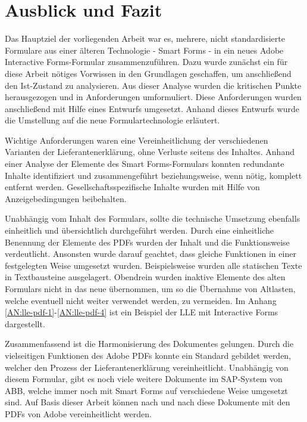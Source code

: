 \chapter{Ausblick und Fazit}
\label{ch:Ausblick}

Das Hauptziel der vorliegenden Arbeit war es, mehrere, nicht standardisierte Formulare aus einer älteren Technologie - Smart Forms - in ein neues Adobe Interactive Forms-Formular zusammenzuführen. Dazu wurde zunächst ein für diese Arbeit nötiges Vorwissen in den Grundlagen geschaffen, um anschließend den Ist-Zustand zu analysieren. Aus dieser Analyse wurden die kritischen Punkte herausgezogen und in Anforderungen umformuliert. Diese Anforderungen wurden anschließend mit Hilfe eines Entwurfs umgesetzt. Anhand dieses Entwurfs wurde die Umstellung auf die neue Formulartechnologie erläutert.

Wichtige Anforderungen waren eine Vereinheitlichung der verschiedenen Varianten der Lieferantenerklärung, ohne Verluste seitens des Inhaltes. Anhand einer Analyse der Elemente des Smart Forms-Formulars konnten redundante Inhalte identifiziert und zusammengeführt beziehungsweise, wenn nötig, komplett entfernt werden. Gesellschaftsspezifische Inhalte wurden mit Hilfe von Anzeigebedingungen beibehalten.

Unabhängig vom Inhalt des Formulars, sollte die technische Umsetzung ebenfalls einheitlich und übersichtlich durchgeführt werden. Durch eine einheitliche Benennung der Elemente des \ac{PDF}s wurden der Inhalt und die Funktionsweise verdeutlicht. Ansonsten wurde darauf geachtet, dass gleiche Funktionen in einer festgelegten Weise umgesetzt wurden. Beispielsweise wurden alle statischen Texte in Textbausteine ausgelagert. Obendrein wurden inaktive Elemente des alten Formulars nicht in das neue übernommen, um so die Übernahme von Altlasten, welche eventuell nicht weiter verwendet werden, zu vermeiden. Im Anhang \ref{AN:lle-pdf-1}-\ref{AN:lle-pdf-4} ist ein Beispiel der \ac{LLE} mit Interactive Forms dargestellt.

Zusammenfassend ist die Harmonisierung des Dokumentes gelungen. Durch die vielseitigen Funktionen des Adobe \ac{PDF}s konnte ein Standard gebildet werden, welcher den Prozess der Lieferantenerklärung vereinheitlicht. Unabhängig von diesem Formular, gibt es noch viele weitere Dokumente im SAP-System von \ac{ABB}, welche immer noch mit Smart Forms auf verschiedene Weise umgesetzt sind. Auf Basis dieser Arbeit können nach und nach diese Dokumente mit den \ac{PDF}s von Adobe vereinheitlicht werden.

 
